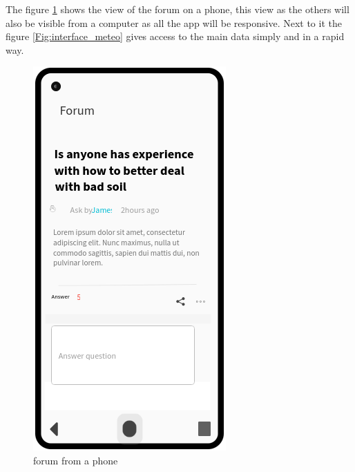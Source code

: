 The figure \ref{Fig:interface_forum} shows the view of the forum on a phone, this view as the others will also be visible from a computer as all the app will be responsive. Next to it the figure \ref{Fig:interface_meteo} gives access to the main data simply and in a rapid way.
\begin{figure}[H]
	\begin{minipage}{0.48\textwidth}
		\centering
		\includegraphics[width=0.6\columnwidth]{Images/forum.png}
		\caption{forum from a phone}
		\label{Fig:interface_forum}
	\end{minipage}
	\begin{minipage}{0.48\textwidth}
		\centering

\end{minipage}
\end{figure}
